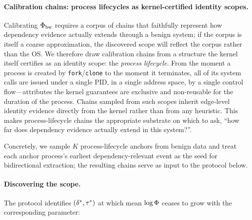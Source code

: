 \paragraph{Calibration chains: process lifecycles as kernel-certified identity scopes.} Calibrating $\Phi_{\text{bw}}$ requires a corpus of chains that faithfully represent how dependency evidence actually extends through a benign system; if the corpus is itself a coarse approximation, the discovered scope will reflect the corpus rather than the OS. We therefore draw calibration chains from a structure the kernel itself certifies as an identity scope: the \emph{process lifecycle}. From the moment a process is created by \texttt{fork}/\texttt{clone} to the moment it terminates, all of its system calls are issued under a single PID, in a single address space, by a single control flow---attributes the kernel guarantees are exclusive and non-reusable for the duration of the process. Chains sampled from such scopes inherit edge-level identity evidence directly from the kernel rather than from any heuristic. This makes process-lifecycle chains the appropriate substrate on which to ask, ``how far does dependency evidence actually extend in this system?''.

Concretely, we sample $K$ process-lifecycle anchors from benign data and treat each anchor process's earliest dependency-relevant event as the seed for bidirectional extraction; the resulting chains serve as input to the protocol below.

\paragraph{Discovering the scope.} The protocol identifies $(\delta^*, \tau^*)$ at which mean $\log \Phi$ ceases to grow with the corresponding parameter:

